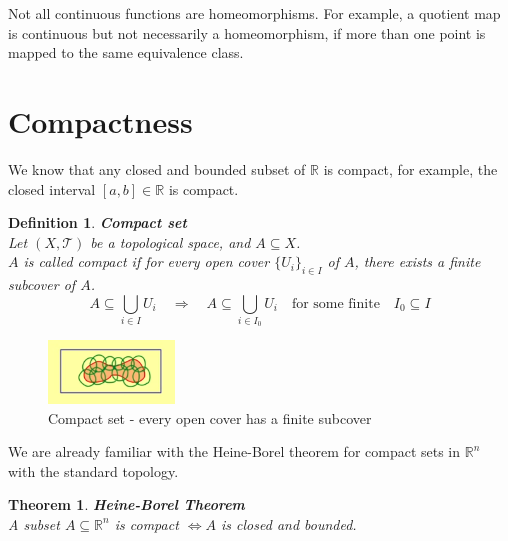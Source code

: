 \documentclass[11pt]{book} %
\newtheorem{theorem}{Theorem}[section]
\newtheorem{definition}{Definition}[section]
\begin{document}
Not all continuous functions are homeomorphisms.
For example, a quotient map is continuous but not necessarily a homeomorphism, if more than one point is mapped 
to the same equivalence class.



\section{Compactness}

We know that any closed and bounded subset of \( \mathbb{R} \) is compact, for example, the closed interval \( [a, b] \in \mathbb{R} \) is compact.

\begin{definition}{\textbf{Compact set}} \\
    Let \( (X, \mathcal{T}) \) be a topological space, and \( A \subseteq X \). \\
    \( A \) is called compact if for every open cover \( \{ U_i \}_{i \in I} \) of \( A \), there exists a finite subcover of \( A \).
    \begin{equation*}
        A \subseteq \bigcup_{i \in I} U_i \quad \Rightarrow \quad A \subseteq \bigcup_{i \in I_0} U_i \quad \text{for some finite} \quad I_0 \subseteq I
    \end{equation*}
    
\end{definition}

\begin{figure}[H]
    \centering
    \includegraphics[width=0.3\textwidth]{Figs/compact_set.png}
    \caption{Compact set - every open cover has a finite subcover}
\end{figure}

We are already familiar with the Heine-Borel theorem for compact sets in \( \mathbb{R}^n \) with the standard topology.
\begin {theorem}{\textbf{Heine-Borel Theorem}} \\
    A subset \( A \subseteq \mathbb{R}^n \) is compact \( \Leftrightarrow A \) is closed and bounded.
\end{theorem}
\end{document}
